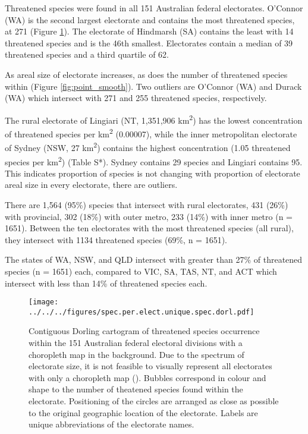\documentclass[a4paper,11pt]{article}
\begin{document}
Threatened species were found in all 151 Australian federal electorates. O'Connor (WA) is the second largest electorate and contains the most threatened species, at 271 (Figure \ref{fig:dorl}). The electorate of Hindmarsh (SA) contains the least with 14 threatened species and is the 46th smallest. Electorates contain a median of 39 threatened species and a third quartile of 62.

As areal size of electorate increases, as does the number of threatened species within (Figure \ref{fig:point_smooth}). Two outliers are O'Connor (WA) and Durack (WA) which intersect with 271 and 255 threatened species, respectively.

The rural electorate of Lingiari (NT, 1,351,906 km\textsuperscript{2}) has the lowest concentration of threatened species per km\textsuperscript{2} (0.00007), while the inner metropolitan electorate of Sydney (NSW, 27 km\textsuperscript{2}) contains the highest concentration (1.05 threatened species per km\textsuperscript{2}) (Table S*). Sydney contains 29 species and Lingiari contains 95. This indicates proportion of species is not changing with proportion of electorate areal size in every electorate, there are outliers.

There are 1,564 (95\%) species that intersect with rural electorates, 431 (26\%) with provincial, 302 (18\%) with outer metro, 233 (14\%) with inner metro (n = 1651). Between the ten electorates with the most threatened species (all rural), they intersect with 1134 threatened species (69\%, n = 1651).

The states of WA, NSW, and QLD intersect with greater than 27\% of threatened species (n = 1651) each, compared to VIC, SA, TAS, NT, and ACT which intersect with less than 14\% of threatened species each.


\begin{figure}[H]
	\centering
    \texttt{[image: ../../../figures/spec.per.elect.unique.spec.dorl.pdf]}
    \caption{Contiguous Dorling cartogram of threatened species occurrence within the 151 Australian federal electoral divisions with a choropleth map in the background. Due to the spectrum of electorate size, it is not feasible to visually represent all electorates with only a choropleth map (\cite{tomasettiMappingAustraliaElectorates2021}). Bubbles correspond in colour and shape to the number of theatened species found within the electorate. Positioning of the circles are arranged as close as possible to the original geographic location of the electorate. Labels are unique abbreviations of the electorate names.}
    \label{fig:dorl}
\end{figure}
\end{document}
